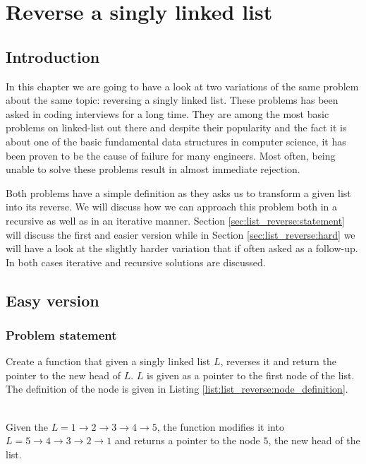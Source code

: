 %

\chapter{Reverse a singly linked list}
\label{ch:list_reverse}

\section*{Introduction}
In this chapter we are going to have a look at two variations of the same problem about the same
topic: reversing a singly linked list. These problems has been asked in coding interviews for a long
time. They are among the most basic problems on linked-list out there and despite their popularity
and the fact it is about one of the basic fundamental data structures in computer science, it has
been proven to be the cause of failure for many engineers. Most often, being unable to solve these
problems result in almost immediate rejection.

Both problems have a simple definition as they asks us to transform a given list into its reverse.
We will discuss how we can approach this problem both in a recursive as well as in an iterative
manner. Section \ref{sec:list_reverse:statement} will discuss the first and easier version while in
Section \ref{sec:list_reverse:hard} we will have a look at the slightly harder variation that if
often asked as a follow-up. In both cases iterative and recursive solutions are discussed.

\section{Easy version}
\label{sec:list_reverse:statementeasy}
\subsection{Problem statement}
\begin{exercise}
Create a function that given a singly linked list $L$, reverses it and return the pointer to the new
head of $L$. $L$ is given as a pointer to the first node of the list. The definition of the node is
given in Listing \ref{list:list_reverse:node_definition}.



\begin{example}
	\hfill \\
	Given the $L = 1 \rightarrow 2 \rightarrow 3 \rightarrow 4 \rightarrow 5$, the function modifies
	it into $L = 5 \rightarrow 4 \rightarrow 3 \rightarrow 2 \rightarrow 1$ and returns a pointer to
	the node $5$, the new head of the list.
\end{example}

\end{exercise}

